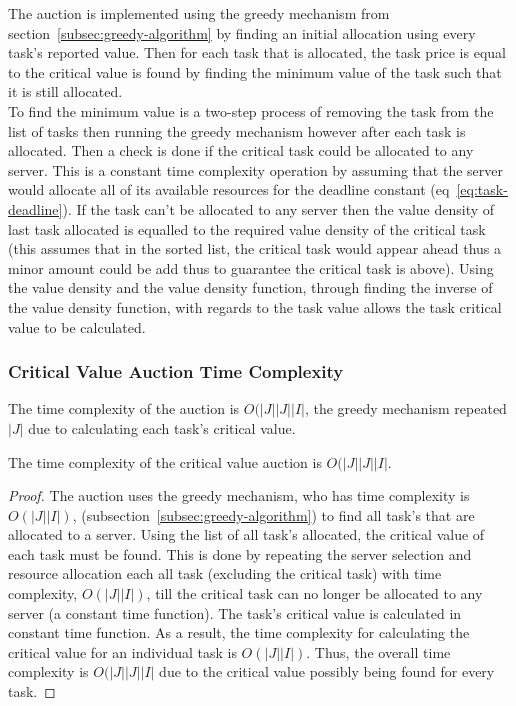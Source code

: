 The auction is implemented using the greedy mechanism from section~\ref{subsec:greedy-algorithm} by finding an initial
allocation using every task's reported value. Then for each task that is allocated, the task price is equal to the
critical value is found by finding the minimum value of the task such that it is still allocated. \\
To find the minimum value is a two-step process of removing the task from the list of tasks then running the greedy
mechanism however after each task is allocated. Then a check is done if the critical task could be allocated to any
server. This is a constant time complexity operation by assuming that the server would allocate all of its available
resources for the deadline constant (eq~\ref{eq:task-deadline}). If the task can't be allocated to any server then the
value density of last task allocated is equalled to the required value density of the critical task (this assumes that
in the sorted list, the critical task would appear ahead thus a minor amount could be add thus to guarantee the
critical task is above). Using the value density and the value density function, through finding the inverse of the
value density function, with regards to the task value allows the task critical value to be calculated.

\subsubsection{Critical Value Auction Time Complexity}
\label{subsubsec:critical-value-auction-time-complexity}
The time complexity of the auction is $O(\left|J\right| \left|J\right| \left|I\right|$, the greedy
mechanism repeated $\left|J\right|$ due to calculating each task's critical value.
\begin{theorem}
    The time complexity of the critical value auction is $O(\left|J\right| \left|J\right| \left|I\right|$.
\end{theorem}
\begin{proof}
    The auction uses the greedy mechanism, who has time complexity is $O(\left|J\right| \left|I\right|)$,
    (subsection~\ref{subsec:greedy-algorithm}) to find all task's that are allocated to a server. Using the
    list of all task's allocated, the critical value of each task must be found. This is done by repeating the
    server selection and resource allocation each all task (excluding the critical task) with time complexity,
    $O(\left|J\right| \left|I\right|)$, till the critical task can no longer be allocated to any server (a constant time function).
    The task's critical value is calculated in constant time function. As a result, the time complexity for
    calculating the critical value for an individual task is $O(\left|J\right| \left|I\right|)$. Thus, the overall time
    complexity is $O(\left|J\right| \left|J\right| \left|I\right|$ due to the critical value possibly being
    found for every task.
\end{proof}

